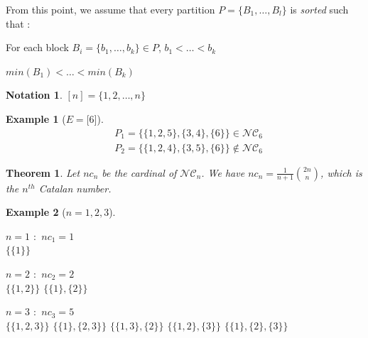 \documentclass[12pt]{report}
\newtheorem{theorem}{Theorem}
\newtheorem*{example}{Example}
\newtheorem*{notation}{Notation}
\begin{document}
From this point, we assume that every partition $P = \{B_1, \ldots, B_l\}$
is \emph{sorted} such that :\\
\begin{itemize*}
    \item For each block $B_i = \{b_1, \ldots, b_k\} \in P$,
        $b_1 < \ldots < b_k$\\
    \item $min (B_1) < \ldots < min (B_k)$\\
\end{itemize*}

\begin{notation}
    $[n] = \{1, 2, \ldots, n\}$
\end{notation}

\begin{example}[$E = \lbrack 6 \rbrack $]
    \begin{align*}
        &P_1 = \{\{1, 2, 5\}, \{3, 4\}, \{6\}\} \in \mathcal{NC}_6\\
        &P_2 = \{\{1, 2, 4\}, \{3, 5\}, \{6\}\} \notin \mathcal{NC}_6
    \end{align*}
\end{example}

\begin{theorem}
    Let $nc_n$ be the cardinal of $\mathcal{NC}_n$.
    We have $nc_n = \frac{1}{n + 1} \binom{2n}{n}$,
    which is the $n^{th}$ Catalan number.
\end{theorem}

\begin{example}[$n = 1, 2, 3$]
    \text{}\\
    \begin{itemize*}
        \item $n = 1$ \text{ } $:$ \text{ } $nc_1 = 1$\\
        \subitem $\{\{1\}\}$\\
        \item $n = 2$ \text{ } $:$ \text{ } $nc_2 = 2$\\
        \subitem $\{\{1, 2\}\}$
        \subitem $\{\{1\}, \{2\}\}$\\
        \item $n = 3$ \text{ } $:$ \text{ } $nc_3 = 5$\\
        \subitem $\{\{1, 2, 3\}\}$
        \subitem $\{\{1\}, \{2, 3\}\}$
        \subitem $\{\{1, 3\}, \{2\}\}$
        \subitem $\{\{1, 2\}, \{3\}\}$
        \subitem $\{\{1\}, \{2\}, \{3\}\}$\\
    \end{itemize*}
\end{example}
\end{document}
